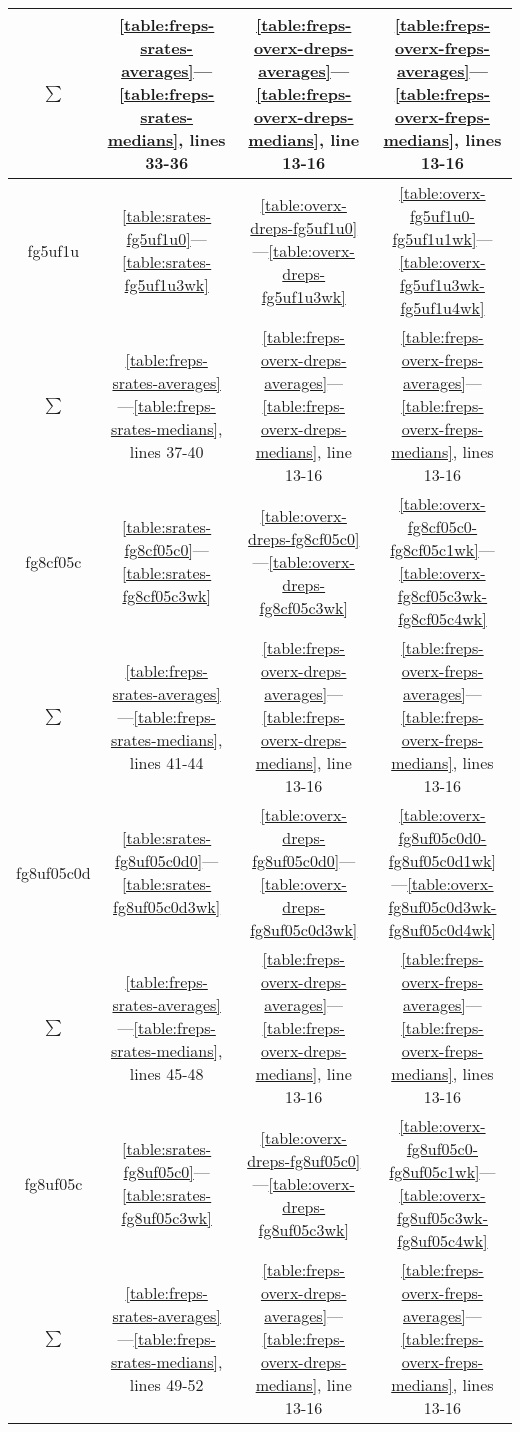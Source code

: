 \documentclass[10pt,oneside]{memoir}
\begin{document}
\begin{table}
\begin{tabular}{|cccc|}
$\sum$ & \ref{table:freps-srates-averages}—\ref{table:freps-srates-medians}, lines 33-36 & \ref{table:freps-overx-dreps-averages}—\ref{table:freps-overx-dreps-medians}, line 13-16 & \ref{table:freps-overx-freps-averages}—\ref{table:freps-overx-freps-medians}, lines 13-16  \\
\hline
fg5uf1u & \ref{table:srates-fg5uf1u0}—\ref{table:srates-fg5uf1u3wk} & \ref{table:overx-dreps-fg5uf1u0}—\ref{table:overx-dreps-fg5uf1u3wk} & \ref{table:overx-fg5uf1u0-fg5uf1u1wk}—\ref{table:overx-fg5uf1u3wk-fg5uf1u4wk} \\
$\sum$ & \ref{table:freps-srates-averages}—\ref{table:freps-srates-medians}, lines 37-40 & \ref{table:freps-overx-dreps-averages}—\ref{table:freps-overx-dreps-medians}, line 13-16 & \ref{table:freps-overx-freps-averages}—\ref{table:freps-overx-freps-medians}, lines 13-16  \\
\hline
fg8cf05c & \ref{table:srates-fg8cf05c0}—\ref{table:srates-fg8cf05c3wk} & \ref{table:overx-dreps-fg8cf05c0}—\ref{table:overx-dreps-fg8cf05c3wk} & \ref{table:overx-fg8cf05c0-fg8cf05c1wk}—\ref{table:overx-fg8cf05c3wk-fg8cf05c4wk} \\
$\sum$ & \ref{table:freps-srates-averages}—\ref{table:freps-srates-medians}, lines 41-44 & \ref{table:freps-overx-dreps-averages}—\ref{table:freps-overx-dreps-medians}, line 13-16 & \ref{table:freps-overx-freps-averages}—\ref{table:freps-overx-freps-medians}, lines 13-16  \\
\hline
fg8uf05c0d & \ref{table:srates-fg8uf05c0d0}—\ref{table:srates-fg8uf05c0d3wk} & \ref{table:overx-dreps-fg8uf05c0d0}—\ref{table:overx-dreps-fg8uf05c0d3wk} & \ref{table:overx-fg8uf05c0d0-fg8uf05c0d1wk}—\ref{table:overx-fg8uf05c0d3wk-fg8uf05c0d4wk} \\
$\sum$ & \ref{table:freps-srates-averages}—\ref{table:freps-srates-medians}, lines 45-48 & \ref{table:freps-overx-dreps-averages}—\ref{table:freps-overx-dreps-medians}, line 13-16 & \ref{table:freps-overx-freps-averages}—\ref{table:freps-overx-freps-medians}, lines 13-16  \\
\hline
fg8uf05c & \ref{table:srates-fg8uf05c0}—\ref{table:srates-fg8uf05c3wk} & \ref{table:overx-dreps-fg8uf05c0}—\ref{table:overx-dreps-fg8uf05c3wk} & \ref{table:overx-fg8uf05c0-fg8uf05c1wk}—\ref{table:overx-fg8uf05c3wk-fg8uf05c4wk} \\
$\sum$ & \ref{table:freps-srates-averages}—\ref{table:freps-srates-medians}, lines 49-52 & \ref{table:freps-overx-dreps-averages}—\ref{table:freps-overx-dreps-medians}, line 13-16 & \ref{table:freps-overx-freps-averages}—\ref{table:freps-overx-freps-medians}, lines 13-16  \\

\end{tabular}
\end{table}
\end{document}
